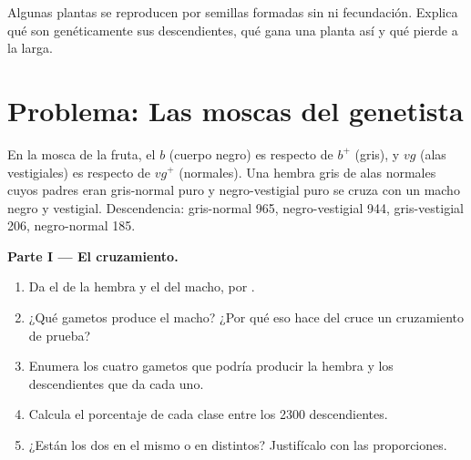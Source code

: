 \begin{exercise}[$\star\star\star$]\label{exo:g12:meiosis-genetic-shuffling:15}
Algunas plantas se reproducen por semillas formadas sin  ni
fecundación. Explica qué son genéticamente sus descendientes, qué gana
una planta así y qué pierde a la larga.
\end{exercise}

\section{Problema: Las moscas del genetista}

\begin{problem}
\label{pb:g12:meiosis-genetic-shuffling:1}
En la mosca de la fruta, el  $b$ (cuerpo negro) es 
respecto de $b^+$ (gris), y $vg$ (alas vestigiales) es 
respecto de $vg^+$ (normales). Una hembra gris de alas normales cuyos
padres eran gris-normal puro y negro-vestigial puro se cruza con un
macho negro y vestigial. Descendencia: gris-normal 965,
negro-vestigial 944, gris-vestigial 206, negro-normal 185.

\medskip
\noindent\textbf{Parte I --- El cruzamiento.}
\begin{enumerate}
  \item Da el  de la hembra y el del macho,  por .
  \item ¿Qué gametos produce el macho? ¿Por qué eso hace del cruce un
        cruzamiento de prueba?
  \item Enumera los cuatro gametos que podría producir la hembra y los
        descendientes que da cada uno.
  \item Calcula el porcentaje de cada clase entre los 2300
        descendientes.
  \item ¿Están los dos  en el mismo  o en 
        distintos? Justifícalo con las proporciones.
\end{enumerate}


\end{problem}
